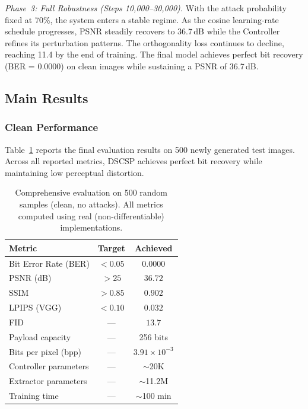 \documentclass[conference]{IEEEtran}
\begin{document}
\textit{Phase~3: Full Robustness (Steps 10{,}000--30{,}000).}
With the attack probability fixed at 70\%, the system enters a stable regime.
As the cosine learning-rate schedule progresses, PSNR steadily recovers to 36.7\,dB while the Controller refines its perturbation patterns.
The orthogonality loss continues to decline, reaching 11.4 by the end of training.
The final model achieves perfect bit recovery (BER = 0.0000) on clean images while sustaining a PSNR of 36.7\,dB.

\subsection{Main Results}
\label{sec:results}

\subsubsection{Clean Performance}
Table~\ref{tab:main_results} reports the final evaluation results on 500 newly generated test images.
Across all reported metrics, DSCSP achieves perfect bit recovery while maintaining low perceptual distortion.

\begin{table}[t]
\centering
\caption{Comprehensive evaluation on 500 random samples (clean, no attacks). All metrics computed using real (non-differentiable) implementations.}
\label{tab:main_results}
\begin{tabular}{@{}lcc@{}}
\toprule
\textbf{Metric} & \textbf{Target} & \textbf{Achieved} \\
\midrule
Bit Error Rate (BER)        & $< 0.05$ & $\mathbf{0.0000}$ \\
PSNR (dB)                   & $> 25$   & $\mathbf{36.72}$ \\
SSIM                        & $> 0.85$ & $\mathbf{0.902}$ \\
LPIPS (VGG)                 & $< 0.10$ & $\mathbf{0.032}$ \\
FID                         & ---      & $\mathbf{13.7}$ \\
\midrule
Payload capacity             & ---      & 256 bits \\
Bits per pixel (bpp)         & ---      & $3.91 \times 10^{-3}$ \\
Controller parameters        & ---      & $\sim$20K \\
Extractor parameters         & ---      & $\sim$11.2M \\
Training time                & ---      & $\sim$100 min \\
\bottomrule
\end{tabular}
\end{table}
\end{document}
